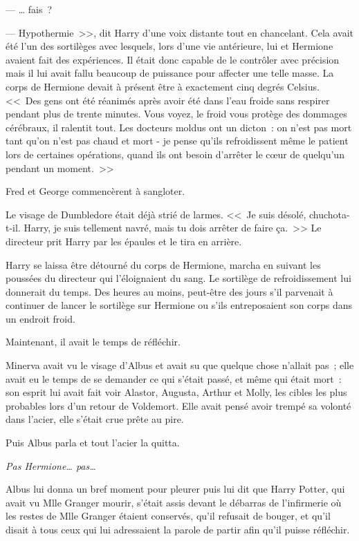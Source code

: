 --- … fais~?

--- Hypothermie~>>, dit Harry d'une voix distante tout en chancelant. Cela avait été l'un des sortilèges avec lesquels, lors d'une vie antérieure, lui et Hermione avaient fait des expériences. Il était donc capable de le contrôler avec précision mais il lui avait fallu beaucoup de puissance pour affecter une telle masse. La corps de Hermione devait à présent être à exactement cinq degrés Celsius. <<~Des gens ont été réanimés après avoir été dans l'eau froide sans respirer pendant plus de trente minutes. Vous voyez, le froid vous protège des dommages cérébraux, il ralentit tout. Les docteurs moldus ont un dicton~: on n'est pas mort tant qu'on n'est pas chaud et mort - je pense qu'ils refroidissent même le patient lors de certaines opérations, quand ils ont besoin d'arrêter le cœur de quelqu'un pendant un moment.~>>

Fred et George commencèrent à sangloter.

Le visage de Dumbledore était déjà strié de larmes. <<~Je suis désolé, chuchota-t-il. Harry, je suis tellement navré, mais tu dois arrêter de faire ça.~>> Le directeur prit Harry par les épaules et le tira en arrière.

Harry se laissa être détourné du corps de Hermione, marcha en suivant les poussées du directeur qui l'éloignaient du sang. Le sortilège de refroidissement lui donnerait du temps. Des heures au moins, peut-être des jours s'il parvenait à continuer de lancer le sortilège sur Hermione ou s'ils entreposaient son corps dans un endroit froid.

Maintenant, il avait le temps de réfléchir.

\later

Minerva avait vu le visage d'Albus et avait su que quelque chose n'allait pas~; elle avait eu le temps de se demander ce qui s'était passé, et même qui était mort~: son esprit lui avait fait voir Alastor, Augusta, Arthur et Molly, les cibles les plus probables lors d'un retour de Voldemort. Elle avait pensé avoir trempé sa volonté dans l'acier, elle s'était crue prête au pire.

Puis Albus parla et tout l'acier la quitta.

\emph{Pas Hermione… pas…}

Albus lui donna un bref moment pour pleurer puis lui dit que Harry Potter, qui avait vu Mlle Granger mourir, s'était assis devant le débarras de l'infirmerie où les restes de Mlle Granger étaient conservés, qu'il refusait de bouger, et qu'il disait à tous ceux qui lui adressaient la parole de partir afin qu'il puisse réfléchir.

